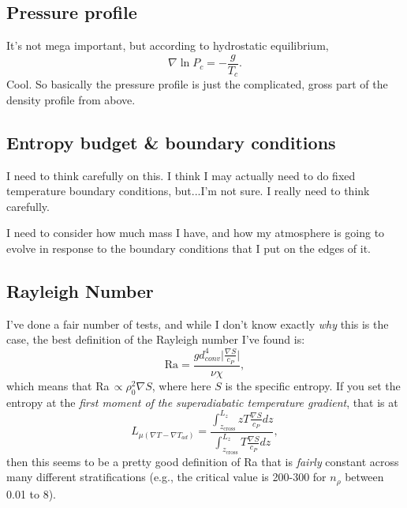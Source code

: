 \documentclass[aps, pre, onecolumn, nofootinbib, notitlepage, groupedaddress, amsfonts, amssymb, amsmath, longbibliography]{revtex4-1}
\newcommand{\grad}{\ensuremath{\nabla}}
\begin{document}
\subsection{Pressure profile}
It's not mega important, but according to hydrostatic equilibrium,
\begin{equation}
\grad \ln P_c = -\frac{g}{T_c}.
\end{equation}
Cool.  So basically the pressure profile is just the complicated, gross part of the density
profile from above.

\subsection{Entropy budget \& boundary conditions}
I need to think carefully on this.  I think I may actually need to do fixed temperature
boundary conditions, but...I'm not sure.  I really need to think carefully.

I need to consider how much mass I have, and how my atmosphere is going to evolve in response
to the boundary conditions that I put on the edges of it.

\subsection{Rayleigh Number}
I've done a fair number of tests, and while I don't know exactly \emph{why} this is the case,
the best definition of the Rayleigh number I've found is:
\begin{equation}
\text{Ra} = \frac{g d_{conv}^4 \bigg|\frac{\grad S}{c_P}\bigg|}{\nu \chi},
\end{equation}
which means that Ra$\,\propto \rho_0^2\grad S$, where here $S$ is the specific entropy. If
you set the entropy at the \emph{first moment of the superadiabatic temperature gradient}, that is
at
\begin{equation}
L_{\mu(\grad T - \grad T_{ad})} = \frac{\int_{z_{\text{cross}}}^{L_z} z T \frac{\grad S}{c_P} dz}
{\int_{z_{\text{cross}}}^{L_z} T \frac{\grad S}{c_P}dz},
\end{equation}
then this seems to be a pretty good definition of Ra that is \emph{fairly} constant across
many different stratifications (e.g., the critical value is 200-300 for $n_\rho$ between
0.01 to 8).


\end{document}
